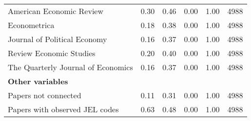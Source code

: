\begin{tabular}{lccccc}
\hspace{3mm}American Economic Review & 0.30 & 0.46 & 0.00 & 1.00 & 4988 \\
\hspace{3mm}Econometrica & 0.18 & 0.38 & 0.00 & 1.00 & 4988 \\
\hspace{3mm}Journal of Political Economy & 0.16 & 0.37 & 0.00 & 1.00 & 4988 \\
\hspace{3mm}Review Economic Studies & 0.20 & 0.40 & 0.00 & 1.00 & 4988 \\
\hspace{3mm}The Quarterly Journal of Economics & 0.16 & 0.37 & 0.00 & 1.00 & 4988 \\
\textbf{Other variables} &   &   &   &   &   \\
\hspace{3mm}Papers not connected & 0.11 & 0.31 & 0.00 & 1.00 & 4988 \\
\hspace{3mm}Papers with observed JEL codes  & 0.63 & 0.48 & 0.00 & 1.00 & 4988 \\
\bottomrule
\end{tabular}
